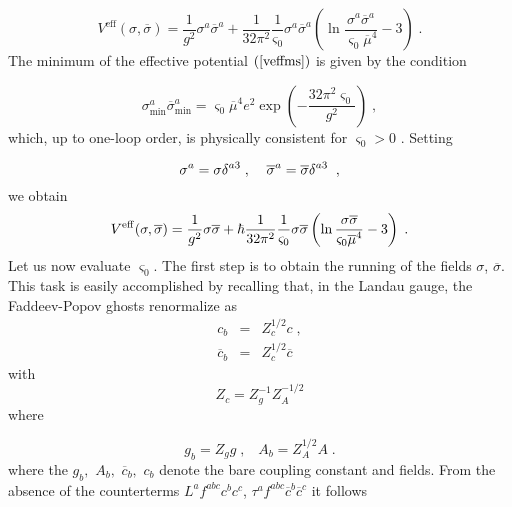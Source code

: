 \documentclass[a4paper,12pt]{article}
\begin{document}
\begin{equation}
V^{\mathrm{eff}}(\sigma ,\overline{\sigma })=\frac{1}{g^{2}}\sigma ^{a}%
\overline{\sigma }^{a}+\frac{1}{32\pi ^{2}}\frac{1}{\varsigma _{0}}\sigma
^{a}\overline{\sigma }^{a}\left( \ln \frac{\sigma ^{a}\overline{\sigma }^{a}%
}{\varsigma _{0}\overline{\mu }^{4}}-3\right) \;.  \label{veffms}
\end{equation}
The minimum of the effective potential $\left( \ref{veffms}\right) $ is
given by the condition

\begin{equation}
\sigma _{\mathrm{\min }}^{a}\overline{\sigma }_{\mathrm{\min }%
}^{a}=\varsigma _{0}\overline{\mu }^{4}e^{2}\exp \left( -\frac{32\pi
^{2}\varsigma _{0}}{g^{2}}\right) \;,  \label{minms}
\end{equation}
which, up to one-loop order, is physically consistent for $\varsigma _{0}>0$%
. Setting

\begin{equation}
\sigma ^{a}=\sigma \delta ^{a3}\;,\;\;\;\;\overline{\sigma }^{a}=\overline{%
\sigma }\delta ^{a3}\;\;,  \label{3d}
\end{equation}
we obtain 
\begin{equation}
V^{\mathrm{eff}}(\sigma ,\overline{\sigma })=\frac{1}{g^{2}}\sigma \overline{%
\sigma }+\hbar \frac{1}{32\pi ^{2}}\frac{1}{\varsigma _{0}}\sigma \overline{%
\sigma }\left( \ln \frac{\sigma \overline{\sigma }}{\varsigma _{0}\overline{%
\mu }^{4}}-3\right) \;. \label{vefffmss}
\end{equation}
Let us now evaluate $\varsigma _{0}$. The first step is to obtain the
running of the fields $\sigma $, $\overline{\sigma }$. This task is easily
accomplished by recalling that, in the Landau gauge, the Faddeev-Popov
ghosts renormalize as \cite{landau,dsv} 
\begin{eqnarray}
c_{b} &=&Z_{c}^{1/2}c\;,  \label{ghr} \\
\overline{c}_{b} &=&Z_{c}^{1/2}\overline{c}  \nonumber
\end{eqnarray}
with 
\begin{equation}
Z_{c}=Z_{g}^{-1}Z_{A}^{-1/2}
\end{equation}
where

\begin{equation}
g_{b}=Z_{g}g\;,\;\;\;A_{b}=Z_{A}^{1/2}A\;.  \label{us}
\end{equation}
where the $g_{b},$ $A_{b},$ $\overline{c}_{b},$ $c_{b}$ denote the bare
coupling constant and fields. From the absence \cite{landau,dsv} of the
counterterms $L^{a}f^{abc}c^{b}c^{c}$, $\tau ^{a}f^{abc}\overline{c}^{b}%
\overline{c}^{c}$ it follows
\end{document}
